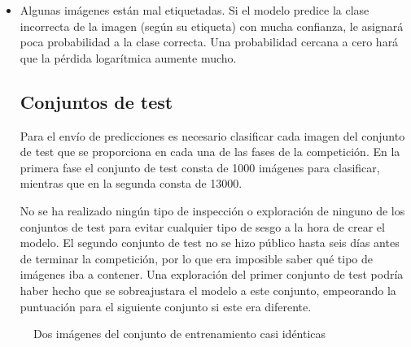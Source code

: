 \begin{itemize}
\item{Algunas imágenes están mal etiquetadas. Si el modelo predice la clase
        incorrecta de la imagen (según su etiqueta) con mucha confianza, le
        asignará poca probabilidad a la clase correcta. Una probabilidad
        cercana a cero hará que la pérdida logarítmica aumente mucho.
}

\subsection{Conjuntos de test}

Para el envío de predicciones es necesario clasificar cada imagen del conjunto
de test que se proporciona en cada una de las fases de la competición. En la
primera fase el conjunto de test consta de 1000 imágenes para clasificar,
mientras que en la segunda consta de 13000.

No se ha realizado ningún tipo de inspección o exploración de ninguno de los
conjuntos de test para evitar cualquier tipo de sesgo a la hora de crear el
modelo. El segundo conjunto de test no se hizo público hasta seis días antes de
terminar la competición, por lo que era imposible saber qué tipo de imágenes
iba a contener. Una exploración del primer conjunto de test podría haber hecho
que se sobreajustara el modelo a este conjunto, empeorando la puntuación para
el siguiente conjunto si este era diferente.
        
\end{itemize}

\begin{figure}
  \caption{Dos imágenes del conjunto de entrenamiento casi idénticas}
\label{same_image}
\end{figure}
